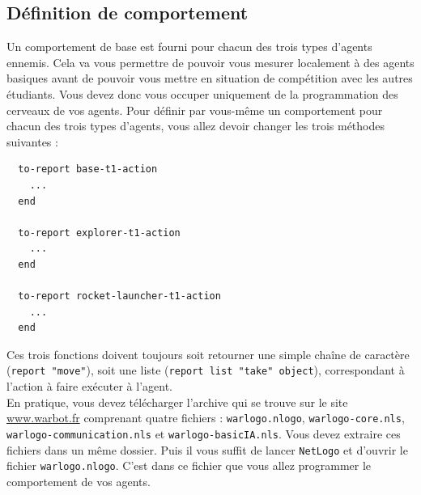 \documentclass[a4paper,11pt]{article}
\begin{document}
\subsection*{Définition de comportement}

Un comportement de base est fourni pour chacun des trois types d'agents ennemis. Cela va vous
permettre de pouvoir vous mesurer localement à des agents basiques avant de pouvoir vous mettre en
situation de compétition avec les autres étudiants. Vous devez donc vous occuper uniquement de la
programmation des cerveaux de vos agents. Pour définir par vous-même un comportement pour chacun des
trois types d'agents, vous allez devoir changer les trois méthodes suivantes :

\begin{verbatim}
  to-report base-t1-action
    ...
  end
  
  to-report explorer-t1-action
    ...
  end
  
  to-report rocket-launcher-t1-action
    ...
  end
\end{verbatim}

Ces trois fonctions doivent toujours soit retourner une simple chaîne de caractère (\texttt{report
"move"}), soit une liste (\texttt{report list "take" object}), correspondant à l'action à faire
exécuter à l'agent.\\

En pratique, vous devez télécharger l'archive qui se trouve sur le site
\href{http://www.warbot.fr}{www.warbot.fr} comprenant quatre fichiers : \texttt{warlogo.nlogo},
\texttt{warlogo-core.nls}, \texttt{warlogo-communication.nls} et \texttt{warlogo-basicIA.nls}. Vous
devez extraire ces fichiers dans un même dossier. Puis il vous suffit de lancer \texttt{NetLogo} et
d'ouvrir le fichier \texttt{warlogo.nlogo}. C'est dans ce fichier que vous allez programmer le
comportement de vos agents.
\end{document}
